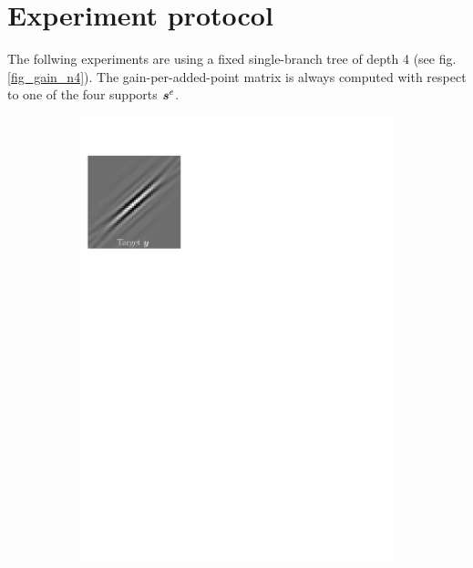 \section{Experiment protocol}
The follwing experiments are using a fixed single-branch tree of depth 4 (see fig. \ref{fig_gain_n4}). The gain-per-added-point matrix is always computed with respect to one of the four supports $\bm{s}^e$.

\begin{figure}[!ht]\centering
\begin{subfigure}[b]{0.32\textwidth}\centering
	\includegraphics[width=\textwidth]{figures/xp_explain/target.pdf}
	\caption{}
\end{subfigure}
\begin{subfigure}[b]{0.32\textwidth}\centering

\end{subfigure}
\end{figure}

